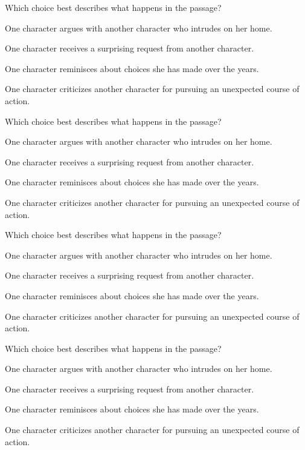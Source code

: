 \documentclass{article}
\begin{document}
\begin{enumext}[mode-box,label=\arabic*,labelwidth=20pt,labelsep=0pt,columns=2,columns-sep=30pt,save-ans=stylesat, wrap-label={\stylesat{#1}}]
 \item Which choice best describes what happens in the passage?
   \begin{keyans}
    \item* One character argues with another character who intrudes on her home.
    \item One character receives a surprising request from another character.
    \item One character reminisces about choices she has made over the years.
    \item One character criticizes another character for pursuing an unexpected course of action.
   \end{keyans}

 \item Which choice best describes what happens in the passage?
   \begin{keyans}
    \item One character argues with another character who intrudes on her home.
    \item One character receives a surprising request from another character.
    \item* One character reminisces about choices she has made over the years.
    \item One character criticizes another character for pursuing an unexpected course of action.
   \end{keyans}

 \item Which choice best describes what happens in the passage?
   \begin{keyans}
    \item One character argues with another character who intrudes on her home.
    \item* One character receives a surprising request from another character.
    \item One character reminisces about choices she has made over the years.
    \item One character criticizes another character for pursuing an unexpected course of action.
   \end{keyans}

 \item Which choice best describes what happens in the passage?
   \begin{keyans}
    \item One character argues with another character who intrudes on her home.
    \item One character receives a surprising request from another character.
    \item One character reminisces about choices she has made over the years.
    \item* One character criticizes another character for pursuing an unexpected course of action.
   \end{keyans}
\end{enumext}

\end{document}
